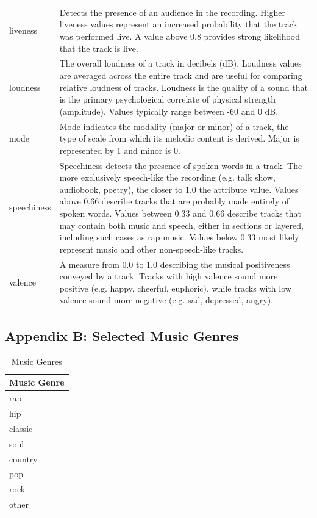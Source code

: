\documentclass{article}
\begin{document}
\begin{table}[htbp]
\begin{tabular}{l p{}}
        liveness & Detects the presence of an audience in the recording. Higher liveness values represent an increased probability that the track was performed live. A value above 0.8 provides strong likelihood that the track is live. \\[3pt]

        loudness & The overall loudness of a track in decibels (dB). Loudness values are averaged across the entire track and are useful for comparing relative loudness of tracks. Loudness is the quality of a sound that is the primary psychological correlate of physical strength (amplitude). Values typically range between -60 and 0 dB. \\[3pt]

        mode & Mode indicates the modality (major or minor) of a track, the type of scale from which its melodic content is derived. Major is represented by 1 and minor is 0. \\[3pt]

        speechiness & Speechiness detects the presence of spoken words in a track. The more exclusively speech-like the recording (e.g. talk show, audiobook, poetry), the closer to 1.0 the attribute value. Values above 0.66 describe tracks that are probably made entirely of spoken words. Values between 0.33 and 0.66 describe tracks that may contain both music and speech, either in sections or layered, including such cases as rap music. Values below 0.33 most likely represent music and other non-speech-like tracks. \\[3pt]

        valence & A measure from 0.0 to 1.0 describing the musical positiveness conveyed by a track. Tracks with high valence sound more positive (e.g. happy, cheerful, euphoric), while tracks with low valence sound more negative (e.g. sad, depressed, angry). \\
        \bottomrule
    \end{tabular}
\end{table}

\pagebreak

\subsection*{Appendix B: Selected Music Genres}\label{sec:appendixB}

\begin{table}[htbp]
    \centering
    \begin{tabular}{l}
        \toprule
        \textbf{Music Genre} \\
        \midrule
        rap \\[3pt]
        hip \\[3pt]
        classic \\[3pt]
        soul \\[3pt]
        country \\[3pt]
        pop \\[3pt]
        rock \\[3pt]
        other \\
        \bottomrule
    \end{tabular}
    \caption{Music Genres}
\end{table}
\end{document}
